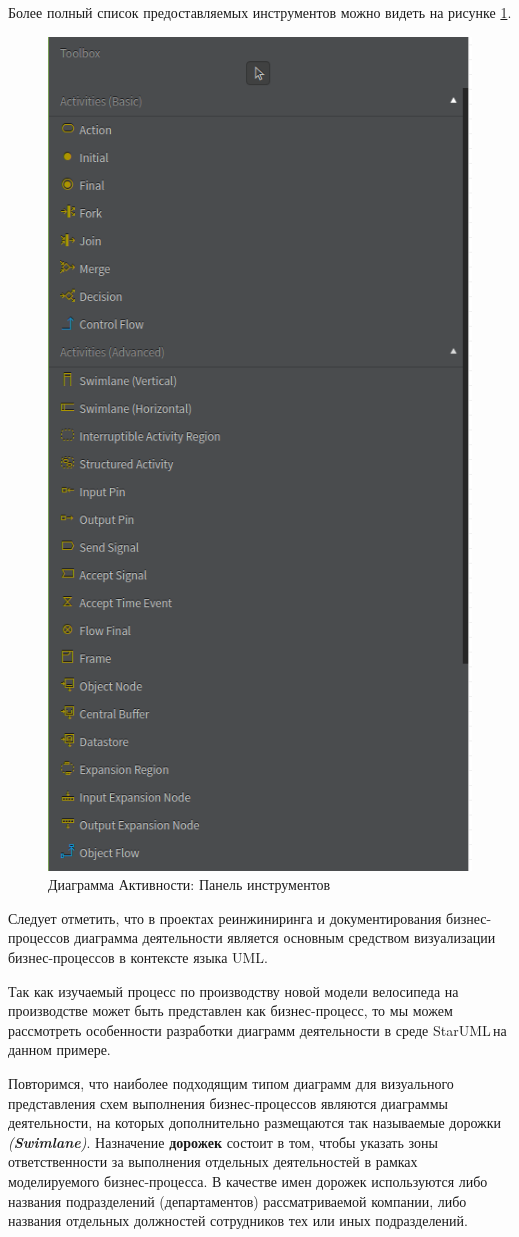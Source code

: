 \documentclass[a4paper,12pt]{extreport}
\newcommand{\staruml}{StarUML\,\tm}
\begin{document}
Более полный список предоставляемых инструментов можно видеть на рисунке \ref{fig:activitytoolbox}.
\begin{figure}[h!]
	\centering
	\includegraphics[width=0.5\linewidth]{images/activitytoolbox}
	\caption{Диаграмма Активности: Панель инструментов}
	\label{fig:activitytoolbox}
\end{figure}

Следует отметить, что в проектах реинжиниринга и документирования бизнес-процессов диаграмма деятельности является основным средством визуализации бизнес-процессов в контексте языка UML. 

Так как изучаемый процесс по производству новой модели велосипеда на производстве может быть представлен как бизнес-процесс, то мы можем рассмотреть особенности разработки диаграмм деятельности в среде \staruml на данном примере. 

Повторимся, что наиболее подходящим типом диаграмм для визуального представления схем выполнения бизнес-процессов являются диаграммы деятельности, на которых дополнительно размещаются так называемые дорожки \textit{(\textbf{Swimlane})}. Назначение \textbf{дорожек} состоит в том, чтобы указать зоны ответственности за выполнения отдельных деятельностей в рамках моделируемого бизнес-процесса. 
В качестве имен дорожек используются либо названия подразделений (департаментов) рассматриваемой компании, либо названия отдельных должностей сотрудников тех или иных подразделений.
\end{document}
